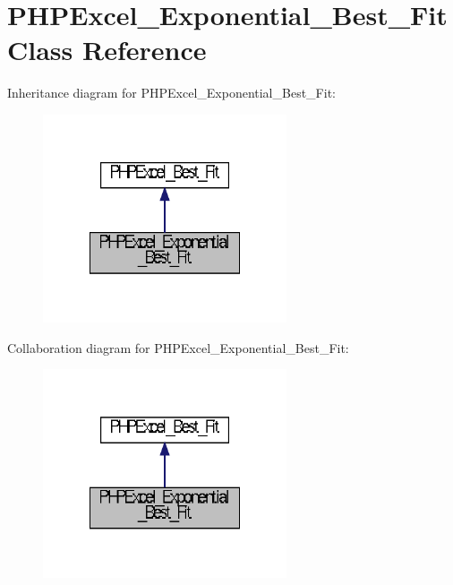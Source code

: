 \section{P\+H\+P\+Excel\+\_\+\+Exponential\+\_\+\+Best\+\_\+\+Fit Class Reference}
\label{class_p_h_p_excel___exponential___best___fit}


Inheritance diagram for P\+H\+P\+Excel\+\_\+\+Exponential\+\_\+\+Best\+\_\+\+Fit\+:\nopagebreak
\begin{figure}[H]
\begin{center}
\leavevmode
\includegraphics[width=204pt]{class_p_h_p_excel___exponential___best___fit__inherit__graph}
\end{center}
\end{figure}


Collaboration diagram for P\+H\+P\+Excel\+\_\+\+Exponential\+\_\+\+Best\+\_\+\+Fit\+:\nopagebreak
\begin{figure}[H]
\begin{center}
\leavevmode
\includegraphics[width=204pt]{class_p_h_p_excel___exponential___best___fit__coll__graph}
\end{center}
\end{figure}
